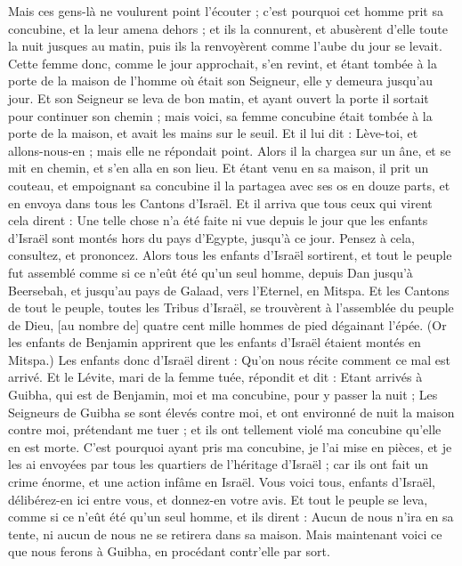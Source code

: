 \begin{multicols}{2}
Mais ces gens-là ne voulurent point l'écouter ; c'est pourquoi cet homme prit sa concubine, et la leur amena dehors ; et ils la connurent, et abusèrent d'elle toute la nuit jusques au matin, puis ils la renvoyèrent comme l'aube du jour se levait.
Cette femme donc, comme le jour approchait, s'en revint, et étant tombée à la porte de la maison de l'homme où était son Seigneur, elle y demeura jusqu'au jour.
Et son Seigneur se leva de bon matin, et ayant ouvert la porte il sortait pour continuer son chemin ; mais voici, sa femme concubine était tombée à la porte de la maison, et avait les mains sur le seuil.
Et il lui dit : Lève-toi, et allons-nous-en ; mais elle ne répondait point. Alors il la chargea sur un âne, et se mit en chemin, et s'en alla en son lieu.
Et étant venu en sa maison, il prit un couteau, et empoignant sa concubine il la partagea avec ses os en douze parts, et en envoya dans tous les Cantons d'Israël.
Et il arriva que tous ceux qui virent cela dirent : Une telle chose n'a été faite ni vue depuis le jour que les enfants d'Israël sont montés hors du pays d'Egypte, jusqu'à ce jour. Pensez à cela, consultez, et prononcez.
\VerseOne{}Alors tous les enfants d'Israël sortirent, et tout le peuple fut assemblé comme si ce n'eût été qu'un seul homme, depuis Dan jusqu'à Beersebah, et jusqu'au pays de Galaad, vers l'Eternel, en Mitspa.
Et les Cantons de tout le peuple, toutes les Tribus d'Israël, se trouvèrent à l'assemblée du peuple de Dieu, [au nombre de] quatre cent mille hommes de pied dégainant l'épée.
(Or les enfants de Benjamin apprirent que les enfants d'Israël étaient montés en Mitspa.) Les enfants donc d'Israël dirent : Qu'on nous récite comment ce mal est arrivé.
Et le Lévite, mari de la femme tuée, répondit et dit : Etant arrivés à Guibha, qui est de Benjamin, moi et ma concubine, pour y passer la nuit ;
Les Seigneurs de Guibha se sont élevés contre moi, et ont environné de nuit la maison contre moi, prétendant me tuer ; et ils ont tellement violé ma concubine qu'elle en est morte.
C'est pourquoi ayant pris ma concubine, je l'ai mise en pièces, et je les ai envoyées par tous les quartiers de l'héritage d'Israël ; car ils ont fait un crime énorme, et une action infâme en Israël.
Vous voici tous, enfants d'Israël, délibérez-en ici entre vous, et donnez-en votre avis.
Et tout le peuple se leva, comme si ce n'eût été qu'un seul homme, et ils dirent : Aucun de nous n'ira en sa tente, ni aucun de nous ne se retirera dans sa maison.
Mais maintenant voici ce que nous ferons à Guibha, en procédant contr'elle par sort.

\end{multicols}

